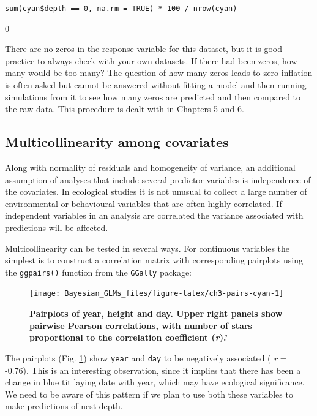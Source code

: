 \documentclass[
]{book}
\begin{document}
\texttt{sum(cyan\$depth\ ==\ 0,\ na.rm\ =\ TRUE)\ *\ 100\ /\ nrow(cyan)}

0

There are no zeros in the response variable for this dataset, but it is good practice to always check with your own datasets. If there had been zeros, how many would be too many? The question of how many zeros leads to zero inflation is often asked but cannot be answered without fitting a model and then running simulations from it to see how many zeros are predicted and then compared to the raw data. This procedure is dealt with in Chapters 5 and 6.

\hypertarget{multicollinearity-among-covariates}{%
\subsection{Multicollinearity among covariates}\label{multicollinearity-among-covariates}}

Along with normality of residuals and homogeneity of variance, an additional assumption of analyses that include several predictor variables is independence of the covariates. In ecological studies it is not unusual to collect a large number of environmental or behavioural variables that are often highly correlated. If independent variables in an analysis are correlated the variance associated with predictions will be affected.

Multicollinearity can be tested in several ways. For continuous variables the simplest is to construct a correlation matrix with corresponding pairplots using the \texttt{ggpairs()} function from the \texttt{GGally} package:



\begin{figure}

{\centering \texttt{[image: Bayesian\_GLMs\_files/figure-latex/ch3-pairs-cyan-1]} 

}

\caption{\textbf{Pairplots of year, height and day. Upper right panels show pairwise Pearson correlations, with number of stars proportional to the correlation coefficient (\emph{r}).'}}\label{fig:ch3-pairs-cyan}
\end{figure}

The pairplots (Fig. \ref{fig:ch3-pairs-cyan}) show \texttt{year} and \texttt{day} to be negatively associated ( \emph{r} = -0.76). This is an interesting observation, since it implies that there has been a change in blue tit laying date with year, which may have ecological significance. We need to be aware of this pattern if we plan to use both these variables to make predictions of nest depth.
\end{document}
